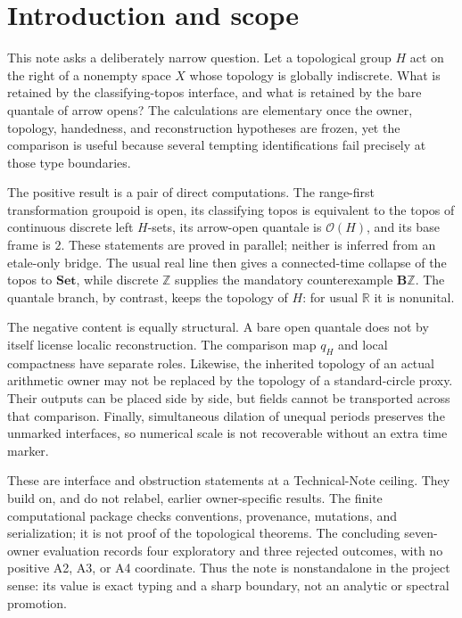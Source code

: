 \documentclass[12pt]{article}
\theoremstyle{definition}
\newcommand{\B}{\mathbf B}
\newcommand{\Ocal}{\mathcal O}
\newcommand{\R}{\mathbb R}
\newcommand{\Z}{\mathbb Z}
\newcommand{\Set}{\mathbf{Set}}
\begin{document}
\section{Introduction and scope}

This note asks a deliberately narrow question.  Let a topological group $H$ act on the right of a nonempty space $X$ whose topology is globally indiscrete.  What is retained by the classifying-topos interface, and what is retained by the bare quantale of arrow opens?  The calculations are elementary once the owner, topology, handedness, and reconstruction hypotheses are frozen, yet the comparison is useful because several tempting identifications fail precisely at those type boundaries.

The positive result is a pair of direct computations.  The range-first transformation groupoid is open, its classifying topos is equivalent to the topos of continuous discrete left $H$-sets, its arrow-open quantale is $\Ocal(H)$, and its base frame is $2$.  These statements are proved in parallel; neither is inferred from an etale-only bridge.  The usual real line then gives a connected-time collapse of the topos to $\Set$, while discrete $\Z$ supplies the mandatory counterexample $\B\Z$.  The quantale branch, by contrast, keeps the topology of $H$: for usual $\R$ it is nonunital.

The negative content is equally structural.  A bare open quantale does not by itself license localic reconstruction.  The comparison map $q_H$ and local compactness have separate roles.  Likewise, the inherited topology of an actual arithmetic owner may not be replaced by the topology of a standard-circle proxy.  Their outputs can be placed side by side, but fields cannot be transported across that comparison.  Finally, simultaneous dilation of unequal periods preserves the unmarked interfaces, so numerical scale is not recoverable without an extra time marker.

These are interface and obstruction statements at a Technical-Note ceiling.  They build on, and do not relabel, earlier owner-specific results.  The finite computational package checks conventions, provenance, mutations, and serialization; it is not proof of the topological theorems.  The concluding seven-owner evaluation records four exploratory and three rejected outcomes, with no positive A2, A3, or A4 coordinate.  Thus the note is nonstandalone in the project sense: its value is exact typing and a sharp boundary, not an analytic or spectral promotion.
\end{document}
